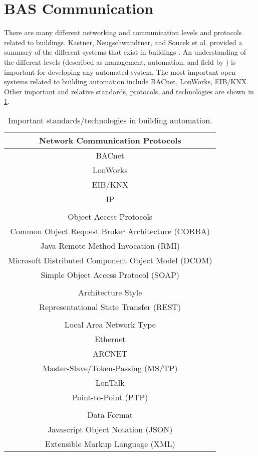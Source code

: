 \section{BAS Communication}
There are many different networking and communication levels and
protocols related to buildings. Kastner, Neugschwandtner, and Soucek et
al. provided a summary of the different systems that exist in buildings
\cite{Kastner2005}. An understanding of the different levels (described
as management, automation, and field by \cite{Kastner2005}) is important
for developing any automated system. The most important open systems
related to building automation include BACnet, LonWorks, EIB/KNX. Other
important and relative standards, protocols, and technologies are shown
in \tableref{} \ref{tab:CommunicationProtocols}.

\begin{table}
\centering
\begin{tabular}{ c }
\toprule

Network Communication Protocols \\
\midrule
\midrule
BACnet\\ 
LonWorks \\
EIB/KNX\\
IP \\
\\
\midrule
Object Access Protocols \\
\midrule
\midrule
Common Object Request Broker Architecture (CORBA) \\
Java Remote Method Invocation (RMI)     \\
Microsoft Distributed Component Object Model (DCOM)  \\
Simple Object Access Protocol (SOAP) \\
\\
\midrule	
Architecture Style \\
\midrule
\midrule
Representational State Transfer (REST) \\
\\
\midrule
Local Area Network Type \\
\midrule
\midrule
Ethernet \\
ARCNET  \\
Master-Slave/Token-Passing (MS/TP) \\
LonTalk  \\
Point-to-Point (PTP)  \\
\\
\midrule
Data Format \\
\midrule
\midrule
Javascript Object Notation (JSON) \\ 
Extensible Markup Language (XML)  \\
\bottomrule
\end{tabular}
\caption{Important standards/technologies in building automation.}
\label{tab:CommunicationProtocols}
\end{table}


